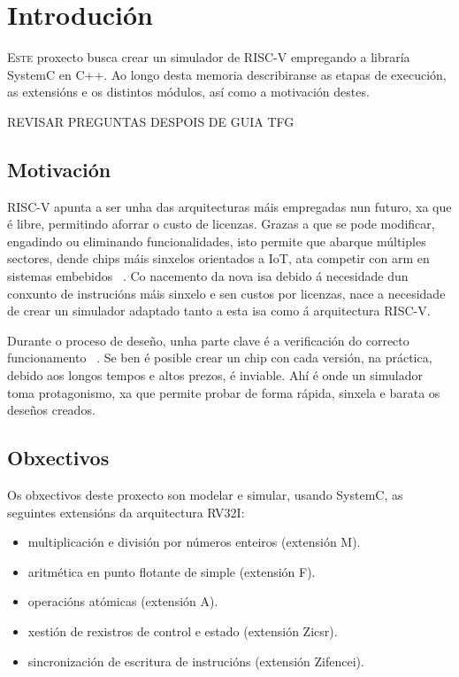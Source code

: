 \chapter{Introdución}
\label{chap:introducion}

\lettrine{E}{ste} proxecto busca crear un simulador de RISC-V empregando a libraría SystemC en C++. Ao longo desta memoria describiranse as etapas de execución, as extensións e os distintos módulos, así como a motivación destes.

 REVISAR PREGUNTAS DESPOIS DE GUIA TFG




\section{Motivación}
\label{sec:motivación}
RISC-V apunta a ser unha das arquitecturas máis empregadas nun futuro, xa que é libre, permitindo aforrar o custo de licenzas. Grazas a que se pode modificar, engadindo ou eliminando funcionalidades, isto permite que abarque múltiples sectores, dende \gls{chips} máis sinxelos orientados a IoT, ata competir con \acrfull{arm} en sistemas embebidos ~\cite{RISCV_IoT,RISCV_vsARM}. Co nacemento da nova \acrfull{isa} debido á necesidade dun conxunto de instrucións máis sinxelo e sen custos por licenzas, nace a necesidade de crear un simulador adaptado tanto a esta \acrshort{isa} como á arquitectura RISC-V.



Durante o proceso de deseño, unha parte clave é a verificación do correcto funcionamento ~\cite{ChipVerify_verification,RISCV_verification}. Se ben é posible crear un chip con cada versión, na práctica, debido aos longos tempos e altos prezos, é inviable. Ahí é onde un simulador toma protagonismo, xa que permite probar de forma rápida, sinxela e barata os deseños creados. 

\section{Obxectivos}
\label{sec:obxectivos}
Os obxectivos deste proxecto son modelar e simular, usando SystemC, as seguintes extensións da arquitectura RV32I: 

\begin{itemize}
    \item multiplicación e división por números enteiros (extensión M).
    \item aritmética en punto flotante de simple (extensión F).
    \item operacións atómicas  (extensión A).
    \item xestión de rexistros de control e estado (extensión Zicsr).
    \item sincronización de escritura de instrucións (extensión Zifencei).
\end{itemize}

